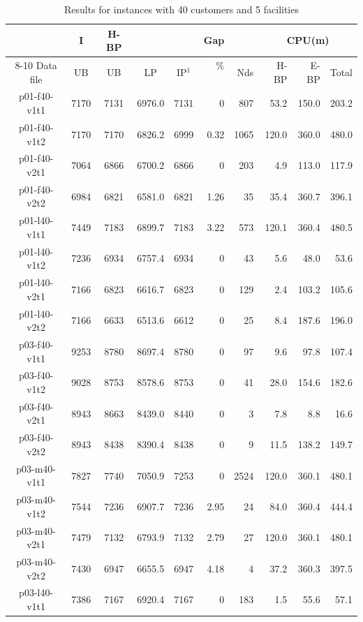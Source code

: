 \begin{table}[!htbp]
\centering
\caption{Results for instances with 40 customers and 5 facilities}\label{40Cust_res2}
\begin {tabular}[!h]{|c|c|c|c|c|r|r|r|r|r|}
\hline
\mbox{}   & I  & H-BP &    &        &    Gap     &       & \multicolumn{3}{|c|}{CPU(m)}\\\cline{8-10}
Data file & UB & UB   & LP & IP$^1$ & \% \ \ & Nds & H-BP & E-BP & Total \\ \hline
p01-f40-v1t1 &  7170 &  7131 &  6976.0  & 7131  & 0 & 807   & 53.2  & 150.0 & 203.2 \\
p01-f40-v1t2 &  7170 &  7170 &  6826.2  & 6999  & 0.32  & 1065  & 120.0 & 360.0 & 480.0 \\
p01-f40-v2t1 &  7064 &  6866 &  6700.2  & 6866  & 0 & 203   & 4.9   & 113.0 & 117.9 \\
p01-f40-v2t2 &  6984 &  6821 &  6581.0  & 6821  & 1.26  & 35    & 35.4  & 360.7 & 396.1 \\\hline
p01-l40-v1t1 &  7449 &  7183 &  6899.7  & 7183  & 3.22  & 573   & 120.1 & 360.4 & 480.5 \\
p01-l40-v1t2 &  7236 &  6934 &  6757.4  & 6934  & 0 & 43    & 5.6   & 48.0  & 53.6  \\
p01-l40-v2t1 &  7166 &  6823 &  6616.7  & 6823  & 0 & 129   & 2.4   & 103.2 & 105.6 \\
p01-l40-v2t2 &  7166 &  6633 &  6513.6  & 6612  & 0 & 25    & 8.4   & 187.6 & 196.0 \\\hline
p03-f40-v1t1 &  9253 &  8780 &  8697.4  & 8780  & 0 & 97    & 9.6   & 97.8  & 107.4 \\
p03-f40-v1t2 &  9028 &  8753 &  8578.6  & 8753  & 0 & 41    & 28.0  & 154.6 & 182.6 \\
p03-f40-v2t1 &  8943 &  8663 &  8439.0  & 8440  & 0 & 3 & 7.8   & 8.8   & 16.6  \\
p03-f40-v2t2 &  8943 &  8438 &  8390.4  & 8438  & 0 & 9 & 11.5  & 138.2 & 149.7 \\\hline
p03-m40-v1t1 &  7827 &  7740 &  7050.9  & 7253  & 0 & 2524  & 120.0 & 360.1 & 480.1 \\
p03-m40-v1t2 &  7544 &  7236 &  6907.7  & 7236  & 2.95  & 24    & 84.0  & 360.4 & 444.4 \\
p03-m40-v2t1 &  7479 &  7132 &  6793.9  & 7132  & 2.79  & 27    & 120.0 & 360.1 & 480.1 \\
p03-m40-v2t2 &  7430 &  6947 &  6655.5  & 6947  & 4.18  & 4 & 37.2  & 360.3 & 397.5 \\\hline
p03-l40-v1t1 &  7386 &  7167 &  6920.4  & 7167  & 0 & 183   & 1.5   & 55.6  & 57.1  \\

\end{tabular}
\end{table}
